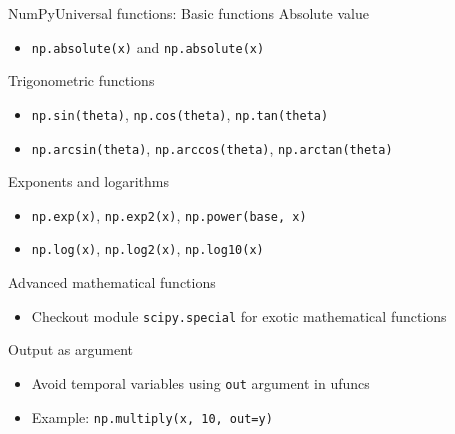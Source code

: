 \documentclass[10pt,compress]{beamer} %
\begin{document}
\begin{frame}{NumPy}{Universal functions: Basic functions}
	Absolute value
	\begin{itemize}
		\item \texttt{np.absolute(x)} and \texttt{np.absolute(x)}
	\end{itemize}
	Trigonometric functions
	\begin{itemize}
		\item \texttt{np.sin(theta)}, \texttt{np.cos(theta)}, \texttt{np.tan(theta)}
		\item \texttt{np.arcsin(theta)}, \texttt{np.arccos(theta)}, \texttt{np.arctan(theta)}
	\end{itemize}
	Exponents and logarithms
	\begin{itemize}
		\item \texttt{np.exp(x)}, \texttt{np.exp2(x)}, \texttt{np.power(base, x)}
		\item \texttt{np.log(x)}, \texttt{np.log2(x)}, \texttt{np.log10(x)}
	\end{itemize}
	Advanced mathematical functions
	\begin{itemize}
		\item Checkout module \texttt{scipy.special} for exotic mathematical functions
	\end{itemize}
	Output as argument
	\begin{itemize}
		\item Avoid temporal variables using \texttt{out} argument in ufuncs
		\item Example: \texttt{np.multiply(x, 10, out=y)} 
	\end{itemize}
\end{frame}
\end{document}
